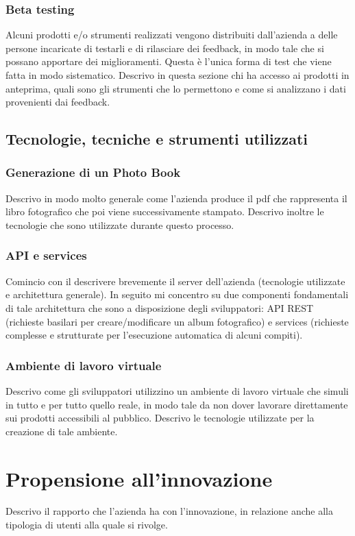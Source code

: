 			\subsubsection{Beta testing}
				Alcuni prodotti e/o strumenti realizzati vengono distribuiti dall'azienda a delle persone incaricate di testarli
				e di rilasciare dei feedback, in modo tale che si possano apportare dei miglioramenti. Questa è l'unica forma di
				test che viene fatta in modo sistematico. Descrivo in questa sezione chi ha accesso ai prodotti in anteprima, quali
				sono gli strumenti che lo permettono e come si analizzano i dati provenienti dai feedback.
		\subsection{Tecnologie, tecniche e strumenti utilizzati}
			\subsubsection{Generazione di un Photo Book}
				Descrivo in modo molto generale come l'azienda produce il pdf che rappresenta il libro fotografico che poi viene
				successivamente stampato. Descrivo inoltre le tecnologie che sono utilizzate durante questo processo.
			\subsubsection{API e services}
				Comincio con il descrivere brevemente il server dell'azienda (tecnologie utilizzate e architettura generale). In
				seguito mi concentro su due componenti fondamentali di tale architettura che sono a disposizione degli sviluppatori:
				API REST (richieste basilari per creare/modificare un album fotografico) e services (richieste complesse e
				strutturate per l'esecuzione automatica di alcuni compiti).
			\subsubsection{Ambiente di lavoro virtuale}
				Descrivo come gli sviluppatori utilizzino un ambiente di lavoro virtuale che simuli in tutto e per tutto quello
				reale, in modo tale da non dover lavorare direttamente sui prodotti accessibili al pubblico. Descrivo le tecnologie
				utilizzate per la creazione di tale ambiente.
	\section{Propensione all'innovazione}
		Descrivo il rapporto che l'azienda ha con l'innovazione, in relazione anche alla tipologia di utenti alla quale si rivolge.
